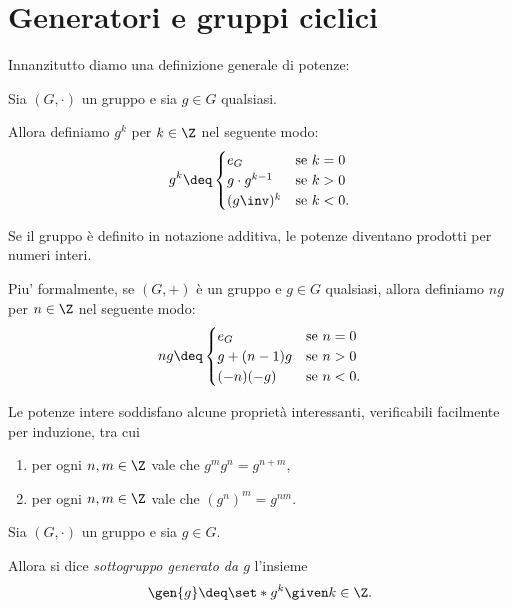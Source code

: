 \section{Generatori e gruppi ciclici}

Innanzitutto diamo una definizione generale di potenze:
\begin{definition} \label{def:potenze_intere}
    Sia $(G, \cdot)$ un gruppo e sia $g \in G$ qualsiasi. 
    
    Allora definiamo $g^k$ per $k \in \Z$ nel seguente modo: \[
        g^k \deq \begin{cases}
            e_G &\text{se } k = 0\\
            g \cdot g^{k-1} &\text{se } k > 0\\
            (g\inv)^k &\text{se } k < 0.
        \end{cases}    
    \]
\end{definition}

Se il gruppo è definito in notazione additiva, le potenze diventano prodotti per numeri interi. 

Piu' formalmente, se $(G, +)$ è un gruppo e $g \in G$ qualsiasi, allora definiamo $ng$ per $n \in \Z$ nel seguente modo: \[
    ng \deq \begin{cases}
        e_G &\text{se } n = 0\\
        g + (n-1)g &\text{se } n > 0\\
        (-n)(-g) &\text{se } n < 0.
    \end{cases}   
\]

Le potenze intere soddisfano alcune proprietà interessanti, verificabili facilmente per induzione, tra cui \begin{enumerate}[label={(P\arabic*)}, ref={(P\arabic*)}]
    \item per ogni $n, m \in \Z$ vale che $g^mg^n = g^{n+m}$,
    \item per ogni $n, m \in \Z$ vale che ${(g^n)}^m = g^{nm}$.
\end{enumerate}

\begin{definition}
     \label{def:sgr_generato}
    Sia $(G, \cdot)$ un gruppo e sia $g \in G$.

    Allora si dice \emph{sottogruppo generato da $g$} l'insieme \[
        \gen{g} \deq \set*{g^k \given k \in \Z}.    
    \]
\end{definition}


